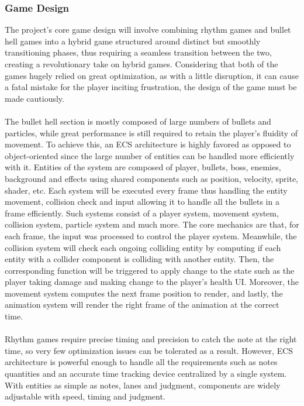 \subsubsection*{Game Design}

The project's core game design will involve combining rhythm games and bullet hell games into a hybrid game
structured around distinct but smoothly transitioning phases,
thus requiring a seamless transition between the two, creating a revolutionary take on hybrid games.
Considering that both of the games hugely relied on great optimization, as with a little disruption,
it can cause a fatal mistake for the player inciting frustration, the design of the game must be made cautiously.
\\\\
The bullet hell section is mostly composed of large numbers of bullets and particles,
while great performance is still required to retain the player’s fluidity of movement.
To achieve this, an ECS architecture is highly favored as opposed to object-oriented
since the large number of entities can be handled more efficiently with it.
Entities of the system are composed of player, bullets, boss, enemies, background and effects
using shared components such as position, velocity, sprite, shader, etc.
Each system will be executed every frame thus handling the entity movement,
collision check and input allowing it to handle all the bullets in a frame efficiently.
Such systems consist of a player system, movement system, collision system, particle system and much more.
The core mechanics are that, for each frame, the input was processed to control the player system.
Meanwhile, the collision system will check each ongoing colliding entity by computing if each entity with a collider component
is colliding with another entity.
Then, the corresponding function will be triggered to apply change to the state such as the player taking damage and making change to the player’s health UI\@.
Moreover, the movement system computes the next frame position to render, and lastly, the animation system will render the right frame of the animation at the correct time.
\\\\
Rhythm games require precise timing and precision to catch the note at the right time,
so very few optimization issues can be tolerated as a result.
However, ECS architecture is powerful enough to handle all the requirements
such as notes quantities and an accurate time tracking device centralized by a single system.
With entities as simple as notes, lanes and judgment, components are widely adjustable with speed, timing and judgment.
